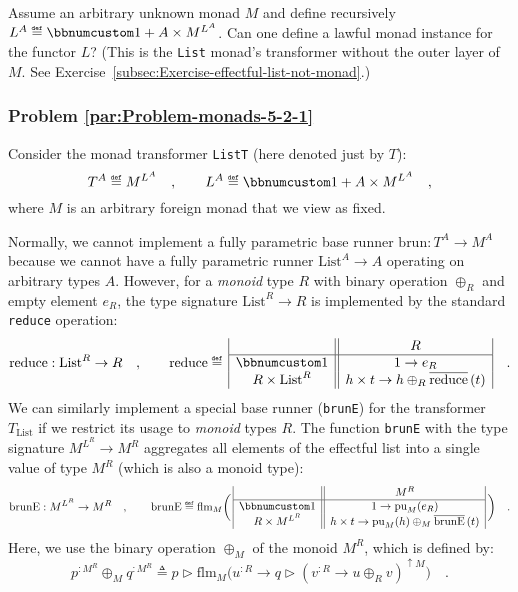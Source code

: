 Assume an arbitrary unknown monad $M$ and define recursively $L^{A}\triangleq\bbnum 1+A\times M^{L^{A}}$.
Can one define a lawful monad instance for the functor $L$? (This
is the \lstinline!List! monad\textsf{'}s transformer without the outer layer
of $M$. See Exercise~\ref{subsec:Exercise-effectful-list-not-monad}.)

\subsubsection{Problem \label{par:Problem-monads-5-2-1}\ref{par:Problem-monads-5-2-1}}

Consider the monad transformer \lstinline!ListT! (here denoted just
by $T$): 
\[
T^{A}\triangleq M^{L^{A}}\quad,\quad\quad L^{A}\triangleq\bbnum 1+A\times M^{L^{A}}\quad,
\]
where $M$ is an arbitrary foreign monad that we view as fixed. 

Normally, we cannot implement a fully parametric base runner $\text{brun}:T^{A}\rightarrow M^{A}$
because we cannot have a fully parametric runner $\text{List}^{A}\rightarrow A$
operating on arbitrary types $A$. However, for a \emph{monoid} type
$R$ with binary operation $\oplus_{R}$ and empty element $e_{R}$,
the type signature $\text{List}^{R}\rightarrow R$ is implemented
by the standard \lstinline!reduce! operation: 
\[
\text{reduce}:\text{List}^{R}\rightarrow R\quad,\quad\quad\text{reduce}\triangleq\,\begin{array}{|c||c|}
 & R\\
\hline \bbnum 1 & 1\rightarrow e_{R}\\
R\times\text{List}^{R} & h\times t\rightarrow h\oplus_{R}\overline{\text{reduce}}\,(t)
\end{array}\quad.
\]
We can similarly implement a special base runner (\lstinline!brunE!)
for the transformer $T_{\text{List}}$ if we restrict its usage to
\emph{monoid} types $R$. The function \lstinline!brunE! with the
type signature $M^{L^{R}}\rightarrow M^{R}$ aggregates all elements
of the effectful list into a single value of type $M^{R}$ (which
is also a monoid type):
\[
\text{brunE}:M^{L^{R}}\rightarrow M^{R}\quad,\quad\quad\text{brunE}\triangleq\text{flm}_{M}\bigg(\,\begin{array}{|c||c|}
 & M^{R}\\
\hline \bbnum 1 & 1\rightarrow\text{pu}_{M}(e_{R})\\
R\times M^{L^{R}} & h\times t\rightarrow\text{pu}_{M}(h)\oplus_{M}\overline{\text{brunE}}\,(t)
\end{array}\,\bigg)\quad.
\]
Here, we use the binary operation $\oplus_{M}$ of the monoid $M^{R}$,
which is defined by:
\[
p^{:M^{R}}\oplus_{M}q^{:M^{R}}\triangleq p\triangleright\text{flm}_{M}\big(u^{:R}\rightarrow q\triangleright(v^{:R}\rightarrow u\oplus_{R}v)^{\uparrow M}\big)\quad.
\]

